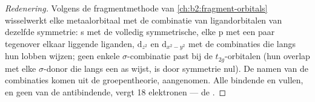 \begin{proof}[Redenering]
Volgens de fragmentmethode van \cref{ch:b2:fragment-orbitals} wisselwerkt elke metaalorbitaal
met de combinatie van ligandorbitalen van dezelfde symmetrie: s met de volledig
symmetrische, elke p met een paar tegenover elkaar liggende liganden, $\mathrm d_{z^2}$ en $\mathrm
d_{x^2-y^2}$ met de combinaties die langs hun lobben wijzen; geen enkele $\sigma$-combinatie
past bij de $t_{2g}$-orbitalen (hun overlap met elke $\sigma$-donor die langs een as wijst,
is door symmetrie nul). De namen van de combinaties komen uit de groepentheorie, aangenomen.
Alle bindende en  vullen, en geen van de antibindende, vergt
18 elektronen --- de .
\end{proof}

